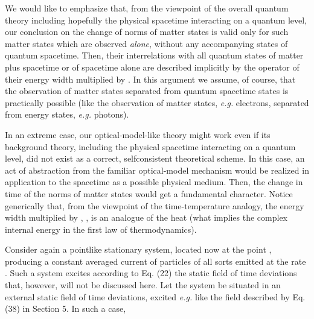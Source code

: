 \documentclass[a4paper,12pt]{article}
\begin{document}
We would like to emphasize that, from the viewpoint of the overall quantum theory including hopefully the physical spacetime interacting on a quantum level, our conclusion on the change of norms of matter states is valid only for such matter states which are observed {\it alone}, without any accompanying states of quantum spacetime. Then, their interrelations with all quantum states of matter plus spacetime or of spacetime alone are described implicitly by the operator of their energy width multiplied by \coordHE{}. In this argument we assume, of course, that the observation of matter states separated from quantum spacetime states is practically possible (like the observation of matter states, {\it e.g.} electrons, separated from energy states, {\it e.g.} photons).

In an extreme case, our optical-model-like theory might work even if its background theory, including the physical spacetime interacting on a quantum level, did not exist as a correct, selfconsistent theoretical scheme. In this case, an act of abstraction from the familiar optical-model mechanism  would be realized in application to the spacetime as a possible physical medium. Then, the change in time of the norms of matter states would get a fundamental character. Notice generically that, from the viewpoint of the time-temperature analogy, the energy width multiplied by \coordHE{}, \coordHE{}, is an analogue of the heat \coordHE{} (what implies the complex internal energy \coordHE{} in the first law of thermodynamics).

\vspace{0.2cm}


\vspace{0.2cm}

Consider again a pointlike stationary system, located now at the point \coordHE{}, producing a constant averaged current \coordHE{} of particles of all sorts emitted at the rate \coordHE{}. Such a system excites according to Eq. (22) the static field \coordHE{} of time deviations that, however, will not be discussed here. Let the system be situated in an external static 
field \coordHE{} of time deviations, excited {\it e.g.} like the field \coordHE{} described by Eq. (38) in Section 5. In such a case,
\end{document}

